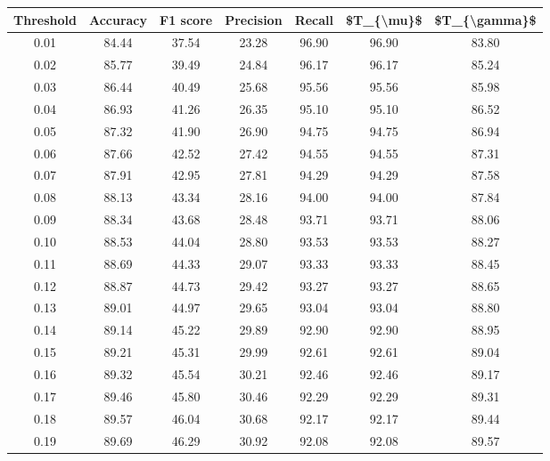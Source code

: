 \begin{tabular}{|c|c|c|c|c|c|c|}
\hline
 Threshold &  Accuracy &  F1 score &  Precision &  Recall &  \$T\_\{\textbackslash mu\}\$ &  \$T\_\{\textbackslash gamma\}\$ \\
\hline
      0.01 &     84.44 &     37.54 &      23.28 &   96.90 &      96.90 &         83.80 \\
      0.02 &     85.77 &     39.49 &      24.84 &   96.17 &      96.17 &         85.24 \\
      0.03 &     86.44 &     40.49 &      25.68 &   95.56 &      95.56 &         85.98 \\
      0.04 &     86.93 &     41.26 &      26.35 &   95.10 &      95.10 &         86.52 \\
      0.05 &     87.32 &     41.90 &      26.90 &   94.75 &      94.75 &         86.94 \\
      0.06 &     87.66 &     42.52 &      27.42 &   94.55 &      94.55 &         87.31 \\
      0.07 &     87.91 &     42.95 &      27.81 &   94.29 &      94.29 &         87.58 \\
      0.08 &     88.13 &     43.34 &      28.16 &   94.00 &      94.00 &         87.84 \\
      0.09 &     88.34 &     43.68 &      28.48 &   93.71 &      93.71 &         88.06 \\
      0.10 &     88.53 &     44.04 &      28.80 &   93.53 &      93.53 &         88.27 \\
      0.11 &     88.69 &     44.33 &      29.07 &   93.33 &      93.33 &         88.45 \\
      0.12 &     88.87 &     44.73 &      29.42 &   93.27 &      93.27 &         88.65 \\
      0.13 &     89.01 &     44.97 &      29.65 &   93.04 &      93.04 &         88.80 \\
      0.14 &     89.14 &     45.22 &      29.89 &   92.90 &      92.90 &         88.95 \\
      0.15 &     89.21 &     45.31 &      29.99 &   92.61 &      92.61 &         89.04 \\
      0.16 &     89.32 &     45.54 &      30.21 &   92.46 &      92.46 &         89.17 \\
      0.17 &     89.46 &     45.80 &      30.46 &   92.29 &      92.29 &         89.31 \\
      0.18 &     89.57 &     46.04 &      30.68 &   92.17 &      92.17 &         89.44 \\
      0.19 &     89.69 &     46.29 &      30.92 &   92.08 &      92.08 &         89.57 \\

\end{tabular}
